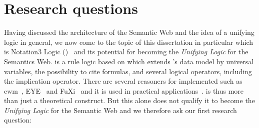 % 
% 
% 
% 



\section{Research questions}
Having discussed the architecture of the Semantic Web and the idea of a unifying logic in general, 
we now come to the topic of this dissertation in particular which  is 
Notation3 Logic (\nthreelogic)~\cite{N3Logic} and its potential for becoming the \emph{Unifying Logic} for the Semantics Web. 
\nthreelogic is a rule logic based on \rdf which extends \rdf's data model by universal variables, the possibility to cite formulas, and  several logical operators, 
including the implication operator. %
There are several reasoners for \nthreelogic implemented such as cwm~\cite{cwm}, EYE~\cite{eye} and FuXi~\cite{fuxi} and it is used in practical applications~\cite{eyepaper}. 
\nthreelogic is thus more than just a theoretical construct. But this alone does not qualify it to become the \emph{Unifying Logic}
for the Semantic Web and we therefore ask our first research question:



